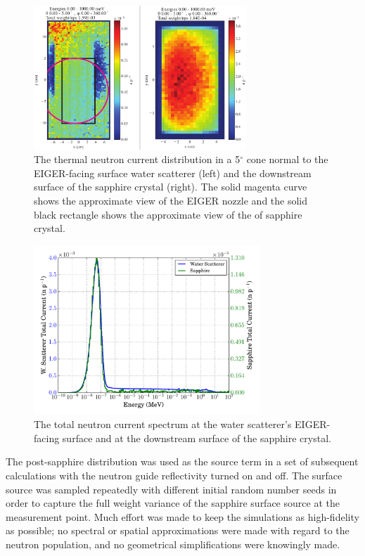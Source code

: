 \documentclass[a4paper,
              ]{jacow}
\begin{document}
\begin{figure}[!htb]
   \centering
   \includegraphics*[trim = 0mm 0mm 0mm 0mm, width=80mm]{THPF102f3.pdf}
   \caption{The thermal neutron current distribution in a 5$^\circ$ cone normal to the EIGER-facing surface water scatterer (left) and the downstream surface of the sapphire crystal (right).  The solid magenta curve shows the approximate view of the EIGER nozzle and the solid black rectangle shows the approximate view of the of sapphire crystal.}
   \label{dists}
\end{figure}

\begin{figure}[!htb]
   \centering
   \includegraphics*[trim = 0mm 0mm 0mm 0mm, width=85mm]{THPF102f4.pdf}
   \caption{The total neutron current spectrum at the water scatterer's EIGER-facing surface and at the downstream surface of the sapphire crystal.}
   \label{specs}
\end{figure}

The post-sapphire distribution was used as the source term in a set of subsequent calculations with the neutron guide reflectivity turned on and off.  The surface source was sampled repeatedly with different initial random number seeds in order to capture the full weight variance of the sapphire surface source at the measurement point.  Much effort was made to keep the simulations as high-fidelity as possible; no spectral or spatial approximations were made with regard to the neutron population, and no geometrical simplifications were knowingly made.
\end{document}

